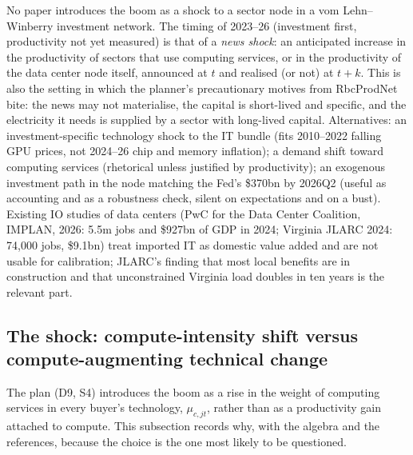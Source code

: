 \documentclass[11pt]{article}
\begin{document}
No paper introduces the boom as a shock to a sector node in a vom Lehn--Winberry investment network. The timing of 2023--26 (investment first, productivity not yet measured) is that of a \emph{news shock}: an anticipated increase in the productivity of sectors that use computing services, or in the productivity of the data center node itself, announced at $t$ and realised (or not) at $t+k$. This is also the setting in which the planner's precautionary motives from RbcProdNet bite: the news may not materialise, the capital is short-lived and specific, and the electricity it needs is supplied by a sector with long-lived capital. Alternatives: an investment-specific technology shock to the IT bundle (fits 2010--2022 falling GPU prices, not 2024--26 chip and memory inflation); a demand shift toward computing services (rhetorical unless justified by productivity); an exogenous investment path in the node matching the Fed's \$370bn by 2026Q2 (useful as accounting and as a robustness check, silent on expectations and on a bust). Existing IO studies of data centers (PwC for the Data Center Coalition, IMPLAN, 2026: 5.5m jobs and \$927bn of GDP in 2024; Virginia JLARC 2024: 74{,}000 jobs, \$9.1bn) treat imported IT as domestic value added and are not usable for calibration; JLARC's finding that most local benefits are in construction and that unconstrained Virginia load doubles in ten years is the relevant part.

\subsection{The shock: compute-intensity shift versus compute-augmenting technical change}\label{sec:shockdesign}

The plan (D9, S4) introduces the boom as a rise in the weight of computing services in every buyer's technology, $\mu_{c,jt}$, rather than as a productivity gain attached to compute. This subsection records why, with the algebra and the references, because the choice is the one most likely to be questioned.
\end{document}
